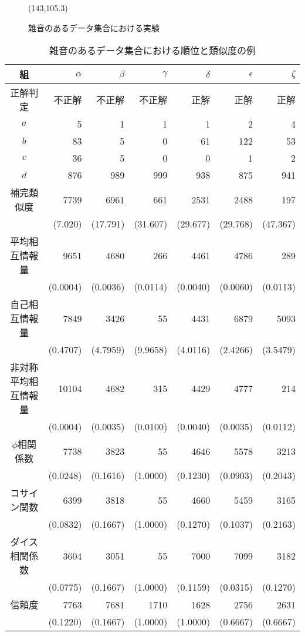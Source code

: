 \begin{figure}[hbtp]
\atari(143,105.3)
\caption{雑音のあるデータ集合における実験} \label{graph:art_noise}
\end{figure}
\begin{table}[hbtp]
\centering
\caption{雑音のあるデータ集合における順位と類似度の例}\label{with-comp}
\begin{tabular}{|c||r|r|r|r|r|r|}
\hline
組 & $\alpha$ & $\beta$ & $\gamma$ & $\delta$ & $\epsilon$ & $\zeta$\\\hline\hline
正解判定 & 不正解 & 不正解 & 不正解 & 正解 & 正解 & 正解\\\hline
$a$ & 5 & 1 & 1 & 1 & 2 & 4\\\hline
$b$ & 83 & 5 & 0 & 61 & 122 & 53\\\hline
$c$ & 36 & 5 & 0 & 0 & 1 & 2\\\hline
$d$ & 876 & 989 & 999 & 938 & 875 & 941\\\hline
{\small 補完類似度} & 7739 & 6961 & 661 & 2531 & 2488 & 197\\
{\small } & (7.020) & (17.791) & (31.607)& (29.677) & (29.768) & (47.367)\\\hline
{\small 平均相互情報量} & 9651 & 4680 & 266 & 4461 & 4786 & 289\\
{\small } & (0.0004) & (0.0036) & (0.0114) & (0.0040) & (0.0060) & (0.0113)\\\hline
{\small 自己相互情報量} & 7849 & 3426 & 55 & 4431 & 6879 & 5093\\
{\small } & (0.4707) & (4.7959) & (9.9658) & (4.0116) & (2.4266) & (3.5479)\\\hline
{\small 非対称平均相互情報量} & 10104 & 4682 & 315 & 4429 & 4777 & 214\\
{\small } & (0.0004) & (0.0035) & (0.0100) & (0.0040) & (0.0035) & (0.0112)\\\hline
{\small $\phi$相関係数} & 7738 & 3823 & 55 & 4646 & 5578 & 3213\\
{\small } & (0.0248) & (0.1616) & (1.0000) & (0.1230) & (0.0903) & (0.2043)\\\hline
{\small コサイン関数} & 6399 & 3818 & 55 & 4660 & 5459 & 3165\\
{\small } & (0.0832) & (0.1667) & (1.0000) & (0.1270) & (0.1037) & (0.2163)\\\hline
{\small ダイス相関係数} & 3604 & 3051 & 55 & 7000 & 7099 & 3182\\
{\small } & (0.0775) & (0.1667) & (1.0000) & (0.1159) & (0.0315) & (0.1270)\\\hline
{\small 信頼度} & 7763 & 7681 & 1710 & 1628 & 2756 & 2631\\
{\small } & (0.1220) & (0.1667) & (1.0000) & (1.0000) & (0.6667) & (0.6667)\\\hline
\end{tabular}
\end{table}
